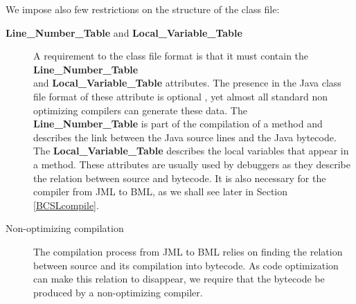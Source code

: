 We impose also few restrictions on the structure of the class file:

\begin{description}
  \item [\textbf{Line\_Number\_Table} and \textbf{Local\_Variable\_Table}]
       A requirement to the class file format is that it must contain 
       the \textbf{Line\_Number\_Table} \\ 
       and \textbf{Local\_Variable\_Table}  attributes. The presence in the Java class file format of 
       these attribute is optional \cite{VMSpec}, yet almost all standard non optimizing compilers can generate these data. 
       The \textbf{Line\_Number\_Table} is part of the compilation of a method and 
       describes the link between the Java source lines and the Java bytecode.
       The \textbf{Local\_Variable\_Table} describes the local variables that appear in a method.  
       These attributes are usually used by debuggers as they describe the relation between source and bytecode.
       It is also necessary for the compiler from JML to BML, as we shall see later in Section \ref{BCSLcompile}.

  \item [Non-optimizing compilation] 
       The compilation process from JML to BML relies on finding the relation between source and its compilation into bytecode.
       As code optimization can make this relation to disappear, we require that the bytecode be produced by a non-optimizing
       compiler.
\end{description}





